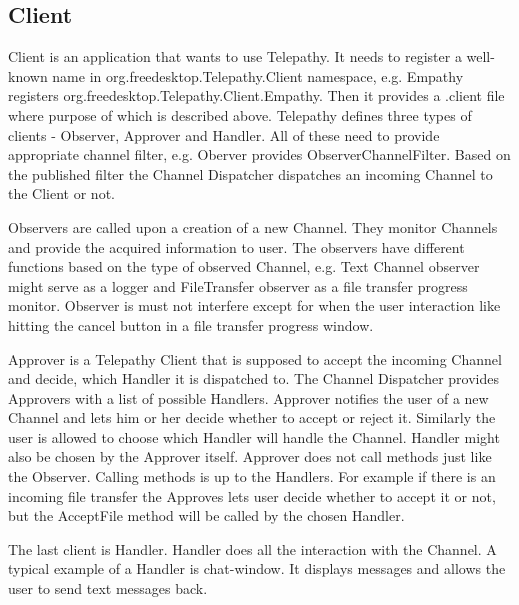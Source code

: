 \subsection*{Client}\label{subsect:tpClient}
Client is an application that wants to use Telepathy. It needs to register a well-known name in org.freedesktop.Telepathy.Client namespace, e.g. Empathy registers org.freedesktop.Telepathy.Client.Empathy. Then it provides a .client file where purpose of which is described above. Telepathy defines three types of clients - Observer, Approver and Handler. All of these need to provide appropriate channel filter, e.g. Oberver provides ObserverChannelFilter. Based on the published filter the Channel Dispatcher dispatches an incoming Channel to the Client or not.\cite{TPWiki}  

Observers are called upon a creation of a new Channel. They monitor Channels and provide the acquired information to user. The observers have different functions based on the type of observed Channel, e.g. Text Channel observer might serve as a logger and FileTransfer observer as a file transfer progress monitor. Observer is must not interfere except for when the user interaction like hitting the cancel button in a file transfer progress window.\cite{TPWiki}     

Approver is a Telepathy Client that is supposed to accept the incoming Channel and decide, which Handler it is dispatched to. The Channel Dispatcher provides Approvers with a list of possible Handlers. Approver notifies the user of a new Channel and lets him or her decide whether to accept or reject it. Similarly the user is allowed to choose which Handler will handle the Channel. Handler might also be chosen by the Approver itself. Approver does not call methods just like the Observer. Calling methods is up to the Handlers. For example if there is an incoming file transfer the Approves lets user decide whether to accept it or not, but the AcceptFile method will be called by the chosen Handler.\cite{TPWiki}  

The last client is Handler. Handler does all the interaction with the Channel. A typical example of a Handler is chat-window. It displays messages and allows the user to send text messages back.\cite{TPWiki}  

